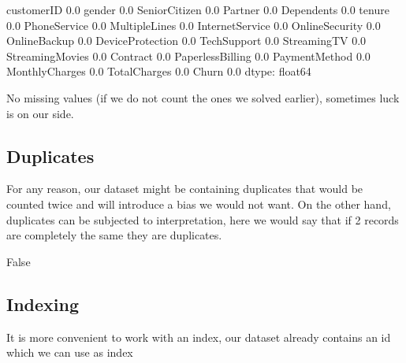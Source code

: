 \documentclass[letterpaper,10pt,english]{jupyterBook}
\begin{document}
\begin{sphinxVerbatim}[commandchars=\\\{\}]
customerID          0.0
gender              0.0
SeniorCitizen       0.0
Partner             0.0
Dependents          0.0
tenure              0.0
PhoneService        0.0
MultipleLines       0.0
InternetService     0.0
OnlineSecurity      0.0
OnlineBackup        0.0
DeviceProtection    0.0
TechSupport         0.0
StreamingTV         0.0
StreamingMovies     0.0
Contract            0.0
PaperlessBilling    0.0
PaymentMethod       0.0
MonthlyCharges      0.0
TotalCharges        0.0
Churn               0.0
dtype: float64
\end{sphinxVerbatim}

\sphinxAtStartPar
No missing values (if we do not count the ones we solved earlier), sometimes luck is on our side.


\subsection{Duplicates}
\label{\detokenize{c7_case_studies/Churn:duplicates}}
\sphinxAtStartPar
For any reason, our dataset might be containing duplicates that would be counted twice and will introduce a bias we would not want. On the other hand, duplicates can be subjected to interpretation, here we would say that if 2 records are completely the same they are duplicates.

\begin{sphinxVerbatim}[commandchars=\\\{\}]
\end{sphinxVerbatim}

\begin{sphinxVerbatim}[commandchars=\\\{\}]
False
\end{sphinxVerbatim}


\subsection{Indexing}
\label{\detokenize{c7_case_studies/Churn:indexing}}
\sphinxAtStartPar
It is more convenient to work with an index, our dataset already contains an id which we can use as index

\begin{sphinxVerbatim}[commandchars=\\\{\}]
  
\end{sphinxVerbatim}
\end{document}
